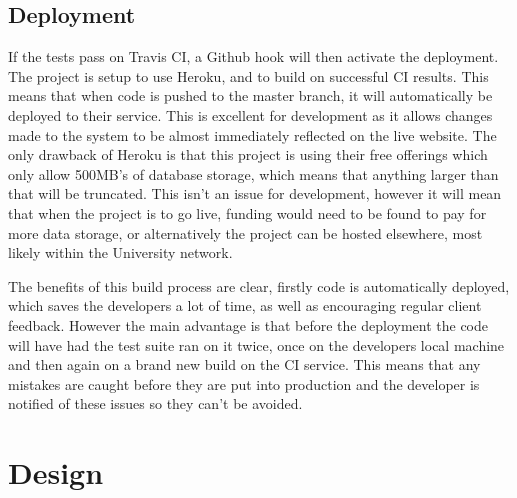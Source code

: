   \subsection{Deployment}
  If the tests pass on Travis CI, a Github hook will then activate the deployment. The project is setup to use Heroku\cite{heroku}, and to build on successful CI results. This means that when code is pushed to the master branch, it will automatically be deployed to their service. This is excellent for development as it allows changes made to the system to be almost immediately reflected on the live website. The only drawback of Heroku is that this project is using their free offerings which only allow 500MB's of database storage, which means that anything larger than that will be truncated. This isn't an issue for development, however it will mean that when the project is to go live, funding would need to be found to pay for more data storage, or alternatively the project can be hosted elsewhere, most likely within the University network.

  The benefits of this build process are clear, firstly code is automatically deployed, which saves the developers a lot of time, as well as encouraging regular client feedback. However the main advantage is that before the deployment the code will have had the test suite ran on it twice, once on the developers local machine and then again on a brand new build on the CI service. This means that any mistakes are caught before they are put into production and the developer is notified of these issues so they can't be avoided. 


\section{Design}
% 
% 
% 

